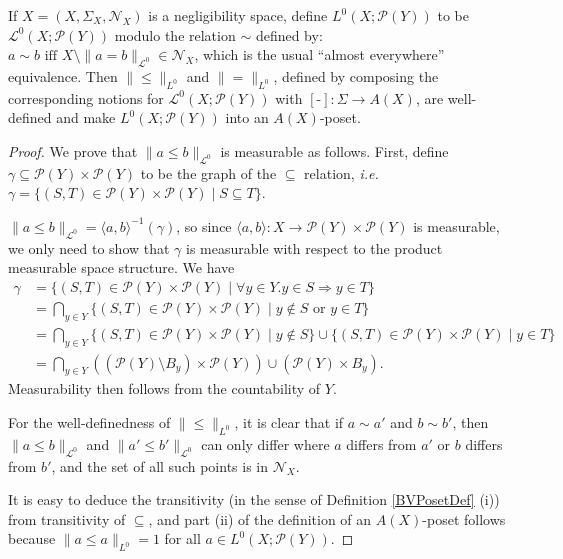 \documentclass{lmcs}
\newcommand{\blank}{\ensuremath{{\mbox{-}}}}
\newcommand{\Ell}{\mathcal{L}}
\newcommand{\En}{\mathcal{N}}
\newcommand{\powerset}{\ensuremath{\mathcal{P}}}
\newcommand{\beq}{\|\mbox{$=$}\|}
\newcommand{\bleq}{\|\mbox{$\leq$}\|}
\begin{document}
\begin{lem}
\label{lem}	
If $X = (X,\Sigma_X,\En_X)$ is a negligibility space, define $L^0(X;\powerset(Y))$ to be $\Ell^0(X;\powerset(Y))$ modulo the relation $\sim$ defined by: 
$a \sim b \text{ iff } X \setminus \| a = b \|_{\Ell^0} \in \En_X$,
which is the usual ``almost everywhere'' equivalence. Then $\bleq_{L^0}$ and $\beq_{L^0}$, defined by composing the corresponding notions for $\Ell^0(X;\powerset(Y))$ with $[\blank] : \Sigma \rightarrow A(X)$, are well-defined and make $L^0(X;\powerset(Y))$ into an $A(X)$-poset. 
\end{lem}
\begin{proof}
We prove that $\| a \leq b \|_{\Ell^0}$ is measurable as follows. First, define $\gamma \subseteq \powerset(Y) \times \powerset(Y)$ to be the graph of the $\subseteq$ relation, \emph{i.e.} $\gamma = \{ (S,T) \in \powerset(Y) \times \powerset(Y) \mid S \subseteq T \}$.
	
$\| a \leq b \|_{\Ell^0} = \langle a, b \rangle^{-1}(\gamma)$, so since $\langle a, b \rangle : X \rightarrow \powerset(Y) \times \powerset(Y)$ is measurable, we only need to show that $\gamma$ is measurable with respect to the product measurable space structure. We have
\begin{align*}
\gamma &= \{ (S,T) \in \powerset(Y) \times \powerset(Y) \mid \forall y \in Y. y \in S \Rightarrow y \in T \} \\
&= \bigcap_{y \in Y} \{ (S,T) \in \powerset(Y) \times \powerset(Y) \mid y \not\in S \text{ or } y \in T \} \\
&= \bigcap_{y \in Y} \{ (S,T) \in \powerset(Y) \times \powerset(Y) \mid y \not\in S \} \cup \{ (S,T) \in \powerset(Y) \times \powerset(Y) \mid y \in T \} \\
&= \bigcap_{y \in Y} ((\powerset(Y) \setminus B_y) \times \powerset(Y)) \cup (\powerset(Y) \times B_y).
\end{align*}
Measurability then follows from the countability of $Y$. 
	
For the well-definedness of $\bleq_{L^0}$, it is clear that if $a \sim a'$ and $b \sim b'$, then $\| a \leq b \|_{\Ell^0}$ and $\| a' \leq b' \|_{\Ell^0}$ can only differ where $a$ differs from $a'$ or $b$ differs from $b'$, and the set of all such points is in $\En_X$. 

It is easy to deduce the transitivity (in the sense of Definition \ref{BVPosetDef} (i)) from transitivity of $\subseteq$, and part (ii) of the definition of an $A(X)$-poset follows because $\| a \leq a \|_{L^0} = 1$ for all $a \in L^0(X;\powerset(Y))$. 
\end{proof}
\end{document}
